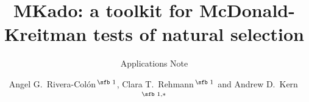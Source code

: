 \documentclass[nocrop]{bioinfo}
\begin{document}

\subtitle{Applications Note}

\title[MKado: McDonald-Kreitman test toolkit]{MKado: a toolkit for McDonald-Kreitman tests of natural selection}
\author[Rivera-Col\'{o}n \textit{et~al.}]{Angel G.\ Rivera-Col\'{o}n\,$^{\text{\sfb 1}}$, Clara T.\ Rehmann\,$^{\text{\sfb 1}}$ and Andrew D.\ Kern\,$^{\text{\sfb 1,}*}$}
\address{$^{\text{\sf 1}}$Institute of Ecology and Evolution and Department of Biology, University of Oregon, Eugene, OR 97403, USA}


\history{}

\editor{}



\maketitle





\vspace*{-10pt}


\vspace*{-12pt}


\vspace*{-12pt}




\end{document}
